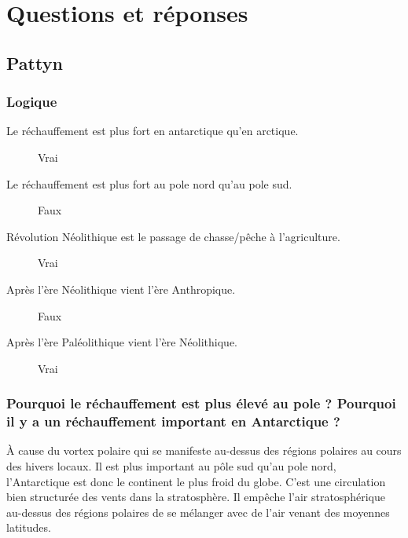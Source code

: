 \section{Questions et réponses}
\subsection{Pattyn}
\subsubsection{Logique}
\begin{description}
	\item [Le réchauffement est plus fort en antarctique qu'en arctique. ]
	\color{cyan}Vrai\color{black}
	
	\item [Le réchauffement est plus fort au pole nord qu'au pole sud. ]
	\color{cyan}Faux\color{black}

	\item [Révolution Néolithique est le passage de chasse/pêche à l'agriculture. ]
	\color{cyan}Vrai\color{black}

	\item [Après l'ère Néolithique vient l'ère Anthropique. ]
	\color{cyan}Faux\color{black}

	\item [Après l'ère Paléolithique vient l'ère Néolithique. ]
	\color{cyan}Vrai\color{black}
\end{description}



\subsubsection{Pourquoi le réchauffement est plus élevé au pole ? Pourquoi il y a un réchauffement important en Antarctique ?}
\color{cyan}
À cause du vortex polaire qui se manifeste au-dessus des régions polaires au cours des hivers locaux. Il est plus important au pôle sud qu'au pole nord, l'Antarctique est donc le continent le plus froid du globe. C'est une circulation bien structurée des vents dans la stratosphère. Il empêche l'air stratosphérique au-dessus des régions polaires de se mélanger avec de l'air venant des moyennes latitudes.
\color{black}



